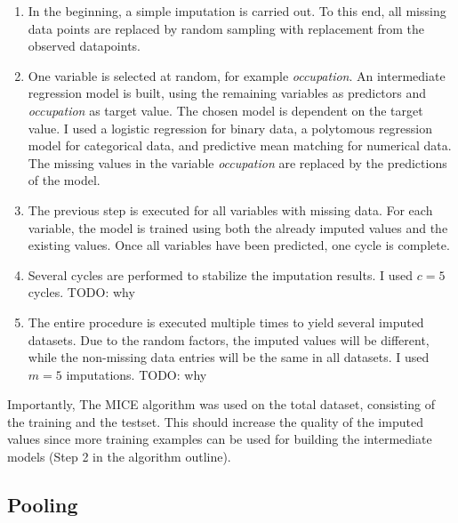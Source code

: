 \documentclass[a4paper]{article}
\begin{document}
\begin{enumerate}
\item In the beginning, a simple imputation is carried out. To
  this end, all missing data points are replaced by random sampling
  with replacement from the observed datapoints.
\item One variable is selected at random, for example
  \emph{occupation}. An intermediate regression model is built, using
  the remaining variables as predictors and \emph{occupation} as target
  value. The chosen model is dependent on the target value. I used a
  logistic regression for binary data, a polytomous regression model
  for categorical data, and predictive mean matching for numerical
  data. The missing values in the variable \emph{occupation} are replaced by the
  predictions of the model.
\item The previous step is executed for all variables with missing
  data. For each variable, the model is trained using both the already
  imputed values and the existing values. Once all variables have been
  predicted, one cycle is complete.
\item Several cycles are performed to stabilize the imputation
  results. I used $c = 5$ cycles. TODO: why
\item The entire procedure is executed multiple times to yield
  several imputed datasets. Due to the random factors, the imputed
  values will be different, while the non-missing data entries will be
  the same in all datasets. I used $m = 5$ imputations. TODO: why
\end{enumerate}

Importantly, The MICE algorithm was used on the total dataset, consisting of the
training and the testset. This should increase
the quality of the imputed values since more training examples can be
used for building the intermediate models (Step 2 in the algorithm
outline).

\subsection{Pooling}
\end{document}
